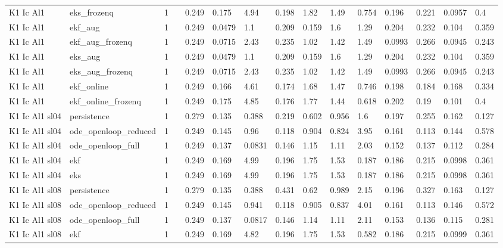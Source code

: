 \begin{table}[t]
\begin{tabular}{lllllllllllllll}
K1 Ic Al1 & eks\_frozenq & 1 &  & 0.249 & 0.175 & 4.94 & 0.198 & 1.82 & 1.49 & 0.754 & 0.196 & 0.221 & 0.0957 & 0.4 \\
K1 Ic Al1 & ekf\_aug & 1 &  & 0.249 & 0.0479 & 1.1 & 0.209 & 0.159 & 1.6 & 1.29 & 0.204 & 0.232 & 0.104 & 0.359 \\
K1 Ic Al1 & ekf\_aug\_frozenq & 1 &  & 0.249 & 0.0715 & 2.43 & 0.235 & 1.02 & 1.42 & 1.49 & 0.0993 & 0.266 & 0.0945 & 0.243 \\
K1 Ic Al1 & eks\_aug & 1 &  & 0.249 & 0.0479 & 1.1 & 0.209 & 0.159 & 1.6 & 1.29 & 0.204 & 0.232 & 0.104 & 0.359 \\
K1 Ic Al1 & eks\_aug\_frozenq & 1 &  & 0.249 & 0.0715 & 2.43 & 0.235 & 1.02 & 1.42 & 1.49 & 0.0993 & 0.266 & 0.0945 & 0.243 \\
K1 Ic Al1 & ekf\_online & 1 &  & 0.249 & 0.166 & 4.61 & 0.174 & 1.68 & 1.47 & 0.746 & 0.198 & 0.184 & 0.168 & 0.334 \\
K1 Ic Al1 & ekf\_online\_frozenq & 1 &  & 0.249 & 0.175 & 4.85 & 0.176 & 1.77 & 1.44 & 0.618 & 0.202 & 0.19 & 0.101 & 0.4 \\
K1 Ic Al1 sl04 & persistence & 1 &  & 0.279 & 0.135 & 0.388 & 0.219 & 0.602 & 0.956 & 1.6 & 0.197 & 0.255 & 0.162 & 0.127 \\
K1 Ic Al1 sl04 & ode\_openloop\_reduced & 1 &  & 0.249 & 0.145 & 0.96 & 0.118 & 0.904 & 0.824 & 3.95 & 0.161 & 0.113 & 0.144 & 0.578 \\
K1 Ic Al1 sl04 & ode\_openloop\_full & 1 &  & 0.249 & 0.137 & 0.0831 & 0.146 & 1.15 & 1.11 & 2.03 & 0.152 & 0.137 & 0.112 & 0.284 \\
K1 Ic Al1 sl04 & ekf & 1 &  & 0.249 & 0.169 & 4.99 & 0.196 & 1.75 & 1.53 & 0.187 & 0.186 & 0.215 & 0.0998 & 0.361 \\
K1 Ic Al1 sl04 & eks & 1 &  & 0.249 & 0.169 & 4.99 & 0.196 & 1.75 & 1.53 & 0.187 & 0.186 & 0.215 & 0.0998 & 0.361 \\
K1 Ic Al1 sl08 & persistence & 1 &  & 0.279 & 0.135 & 0.388 & 0.431 & 0.62 & 0.989 & 2.15 & 0.196 & 0.327 & 0.163 & 0.127 \\
K1 Ic Al1 sl08 & ode\_openloop\_reduced & 1 &  & 0.249 & 0.145 & 0.941 & 0.118 & 0.905 & 0.837 & 4.01 & 0.161 & 0.113 & 0.146 & 0.572 \\
K1 Ic Al1 sl08 & ode\_openloop\_full & 1 &  & 0.249 & 0.137 & 0.0817 & 0.146 & 1.14 & 1.11 & 2.11 & 0.153 & 0.136 & 0.115 & 0.281 \\
K1 Ic Al1 sl08 & ekf & 1 &  & 0.249 & 0.169 & 4.82 & 0.196 & 1.75 & 1.53 & 0.582 & 0.186 & 0.215 & 0.0999 & 0.361 \\

\end{tabular}
\end{table}
